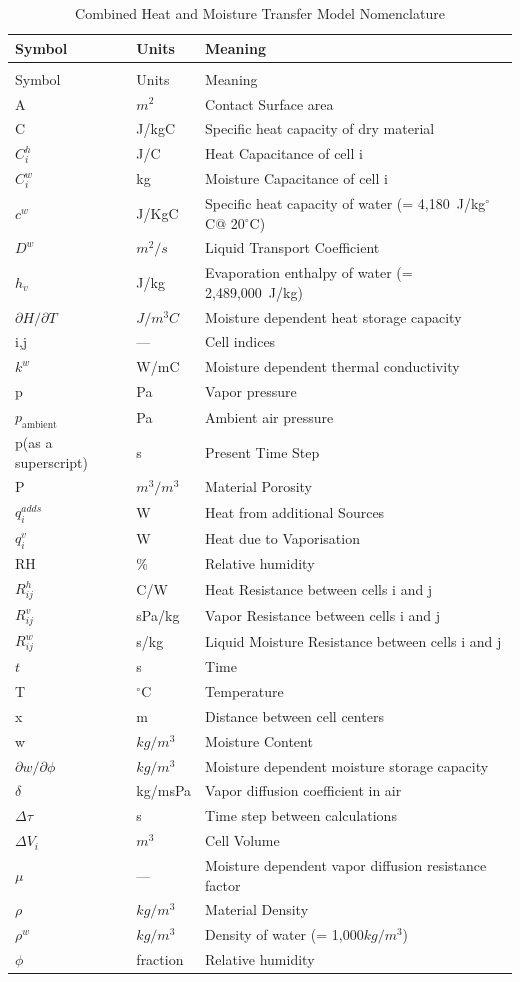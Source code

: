 \begin{longtable}[c]{p{1.5in}p{1.0in}p{3.5in}}
\caption{Combined Heat and Moisture Transfer Model Nomenclature \label{table:combined-heat-and-moisture-transfer-model}} \tabularnewline
\toprule
Symbol & Units & Meaning \tabularnewline
\midrule
\endfirsthead

\caption[]{Combined Heat and Moisture Transfer Model Nomenclature} \tabularnewline
\toprule
Symbol & Units & Meaning \tabularnewline
\midrule
\endhead

A & $m^2$ & Contact Surface area \tabularnewline
C & J/kgC & Specific heat capacity of dry material \tabularnewline
$C_i^h$ & J/C & Heat Capacitance of cell i \tabularnewline
$C_i^w$ & kg & Moisture Capacitance of cell i \tabularnewline
$c^{w}$ & J/KgC & Specific heat capacity of water (= 4,180~J/kg$^{\circ}$C@ 20$^{\circ}$C) \tabularnewline
${D^w}$ & $m^2/s$ & Liquid Transport Coefficient \tabularnewline
${h_v}$ & J/kg & Evaporation enthalpy of water (= 2,489,000~J/kg) \tabularnewline
$\partial{H}/\partial{T}$ & $J/m^3C$ & Moisture dependent heat storage capacity \tabularnewline
i,j & --- & Cell indices \tabularnewline
${k^w}$ & W/mC & Moisture dependent thermal conductivity \tabularnewline
p & Pa & Vapor pressure \tabularnewline
$p_{\text{ambient}}$ & Pa & Ambient air pressure \tabularnewline
p(as a superscript) & s & Present Time Step \tabularnewline
P & $m^3/m^3$ & Material Porosity \tabularnewline
${q_i^{adds}}$ & W & Heat from additional Sources \tabularnewline
${q_i^v}$ & W & Heat due to Vaporisation \tabularnewline
RH & \% & Relative humidity \tabularnewline
$R_{ij}^h$ & C/W & Heat Resistance between cells i and j \tabularnewline
$R_{ij}^v$ & sPa/kg & Vapor Resistance between cells i and j \tabularnewline
$R_{ij}^w$ & s/kg & Liquid Moisture Resistance between cells i and j \tabularnewline
$t$ & s & Time \tabularnewline
T & $^\circ$C & Temperature \tabularnewline
x & m & Distance between cell centers \tabularnewline
w & $kg/m^3$ & Moisture Content \tabularnewline
$\partial{w}/\partial{\phi}$ & $kg/m^3$ & Moisture dependent moisture storage capacity \tabularnewline
$\delta$ & kg/msPa & Vapor diffusion coefficient in air \tabularnewline
$\Delta \tau$ & s & Time step between calculations \tabularnewline
$\Delta {V_i}$ & $m^3$ & Cell Volume \tabularnewline
$\mu$ & --- & Moisture dependent vapor diffusion resistance factor \tabularnewline
$\rho$ & $kg/m^3$ & Material Density \tabularnewline
${\rho}^w$ & $kg/m^3$ & Density of water (= 1,000$kg/m^3$) \tabularnewline
$\phi$ & fraction & Relative humidity \tabularnewline
\bottomrule
\end{longtable}

